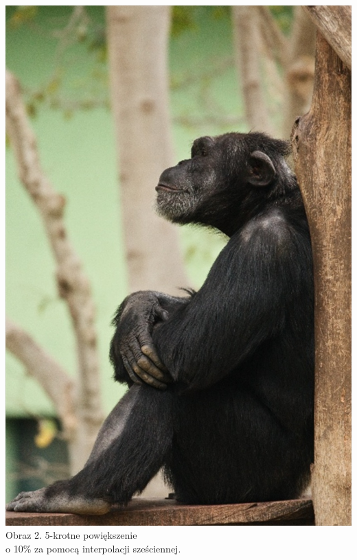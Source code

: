 \documentclass[14pt]{article}
\begin{document}
\begin{center}
    \vspace{1.5cm}
    \begin{minipage}{7cm}
        \begin{center}
            \includegraphics[scale=0.15]{images/5x_10_bc.jpg}
            \\ \small Obraz 2. 5-krotne powiększenie 
            \\o 10\% za pomocą interpolacji sześciennej.
        \end{center}
    \end{minipage}
    \hfill
    \begin{minipage}{7cm}
        \begin{center}
            \vspace{1.2cm}

\end{center}
\end{minipage}
\end{center}
\end{document}
